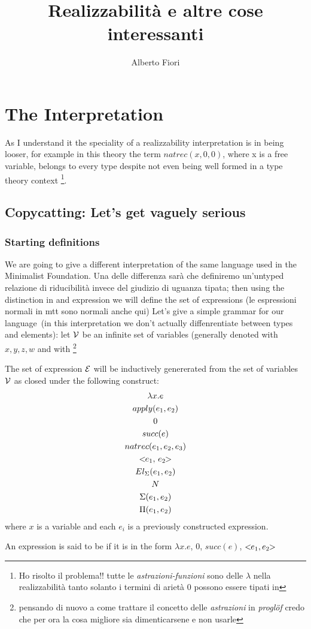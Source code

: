 \documentclass[12pt,draft,oneside]{amsbook}
\author{Alberto Fiori}
\title{Realizzabilità e altre cose interessanti}
\begin{document}
\maketitle
\chapter{The Interpretation}
	As I understand it the speciality of a 
	realizzability 	interpretation is in 
	being looser, for example in this theory
	the term $natrec(x, 0, 0)$, where x is a 
	free variable, belongs to every type despite 
	not even being well formed in a type theory context \footnote{Ho risolto il  problema!! tutte le \emph{astrazioni-funzioni} sono delle $\lambda$ nella realizzabilità tanto solanto i termini di arietà 0 possono essere tipati in }.



\section{Copycatting: Let's get vaguely serious}
	\subsection{Starting definitions}
		We are going to give a different interpretation 
		of the same language used in the Minimalist 
		Foundation. Una delle differenza sarà che definiremo
		un'untyped relazione di riducibilità invece 
		del giudizio di uguanza tipata; then using the distinction in  and  expression we will define the set of  expressions (le espressioni normali in mtt sono normali anche qui)
		Let's give a simple grammar for our language~(in this interpretation we don't actually diffenrentiate between types and elements): let $\Va$ be an infinite set of variables (generally denoted with $x,y,z,w$ and with \footnote{pensando di nuovo a come trattare il concetto delle \emph{astrazioni} in \textsl{proglöf} credo che per ora la cosa migliore sia dimenticarsene e non usarle}		
\begin{dede}
	The set of expression $\Ve$ will be inductively genererated from the set of variables $\Va$ as closed under the following construct:
	\begin{gather}
	 \lambda x.e \\
	 apply(e_1,e_2) \\
	 0 \\ 
	 succ(e) \\ 
	 natrec(e_1,e_2,e_3) \\ 
	 \cp[e_1,\,e_2] \\
	 El_\Sigma(e_1, e_2) \\
	 N 		\\
	 \Sigma(e_1,e_2)\\
	 \Pi(e_1,e_2)
	\end{gather}
	where $x$ is a variable and each $e_i$ is a previously constructed expression.
	\end{dede}
	\begin{dede}
		An expression is said to be  if it is in the form $\lambda x.e$, 0, $succ(e)$, $\cp[e_1,e_2]$ 
	\end{dede}
	
\end{document}
